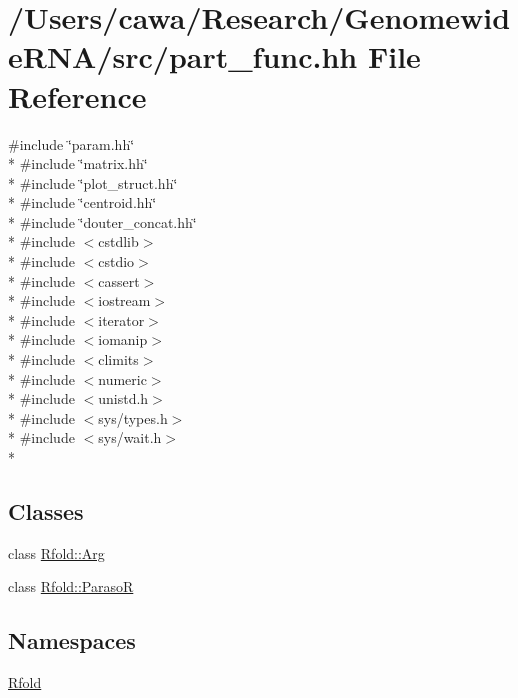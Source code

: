 \hypertarget{part__func_8hh}{\section{/\+Users/cawa/\+Research/\+Genomewide\+R\+N\+A/src/part\+\_\+func.hh File Reference}
\label{part__func_8hh}
}
{\ttfamily \#include \char`\"{}param.\+hh\char`\"{}}\\*
{\ttfamily \#include \char`\"{}matrix.\+hh\char`\"{}}\\*
{\ttfamily \#include \char`\"{}plot\+\_\+struct.\+hh\char`\"{}}\\*
{\ttfamily \#include \char`\"{}centroid.\+hh\char`\"{}}\\*
{\ttfamily \#include \char`\"{}douter\+\_\+concat.\+hh\char`\"{}}\\*
{\ttfamily \#include $<$cstdlib$>$}\\*
{\ttfamily \#include $<$cstdio$>$}\\*
{\ttfamily \#include $<$cassert$>$}\\*
{\ttfamily \#include $<$iostream$>$}\\*
{\ttfamily \#include $<$iterator$>$}\\*
{\ttfamily \#include $<$iomanip$>$}\\*
{\ttfamily \#include $<$climits$>$}\\*
{\ttfamily \#include $<$numeric$>$}\\*
{\ttfamily \#include $<$unistd.\+h$>$}\\*
{\ttfamily \#include $<$sys/types.\+h$>$}\\*
{\ttfamily \#include $<$sys/wait.\+h$>$}\\*
\subsection*{Classes}
\begin{DoxyCompactItemize}
\item 
class \hyperlink{class_rfold_1_1_arg}{Rfold\+::\+Arg}
\item 
class \hyperlink{class_rfold_1_1_paraso_r}{Rfold\+::\+Paraso\+R}
\end{DoxyCompactItemize}
\subsection*{Namespaces}
\begin{DoxyCompactItemize}
\item 
 \hyperlink{namespace_rfold}{Rfold}
\end{DoxyCompactItemize}
